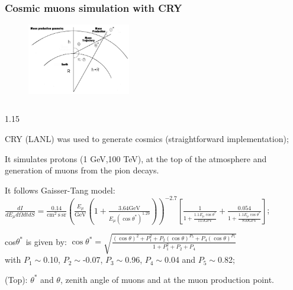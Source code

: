 \documentclass{beamer}
\begin{document}
\begin{frame}

    \frametitle{Cosmic muons simulation with CRY}
    \begin{figure}[!h]
        \centering
        \includegraphics[width =0.4\textwidth]{figures/png/Screenshot_20240526_140716.png}
        \label{fig:anglesinmuon}
    \end{figure}
        \begin{columns}
            \begin{column}{1.15\framewidth}
                \setlength{\leftmargini}{1.em}

                \begin{itemize}
                   {\small 
                   
                    \item CRY (LANL) was used to generate cosmics (straightforward implementation);
                    \item It simulates protons (1 GeV,100 TeV), at the top of the 
                    atmosphere and generation of muons from the pion decays. 
                    \item It follows Gaisser-Tang model:
                    \\     {\footnotesize               $ \frac{d I}{d E_\mu d \Omega d t d S}=\frac{0.14}{\mathrm{cm}^2 \mathrm{~s} \ \mathrm{sr} }\left( \frac{E_\mu}{\mathrm{GeV}} \left(1+\frac{3.64 \mathrm{GeV}}{E_\mu\left(\cos \theta^*\right)^{1.29}}\right)\right)^{-2.7}\left[\frac{1}{1+\frac{1.1 E_\mu \cos \theta^*}{115 \mathrm{GeV}}}+\frac{0.054}{1+\frac{1.1 E_\mu \cos \theta^*}{850 \mathrm{GeV}}}\right]$};
                     \item cos$\theta^*$ is given by:
                     {\footnotesize  $\cos \theta^*=\sqrt{\frac{(\cos \theta)^2+P_1^2+P_2(\cos \theta)^{P_3}+P_4(\cos \theta)^{P_5}}{1+P_1^2+P_2+P_4}}$
                     \\ with $P_1\sim$0.10, $P_2\sim$-0.07, $P_3\sim$0.96, $P_4\sim$0.04 and $P_5\sim$0.82};
                    \item (Top): $\theta^*$ and $\theta$, zenith angle of muons and 
                   at the muon production point. 
                   }
                \end{itemize}
            \end{column}
            \end{columns}
\end{frame}
\end{document}
